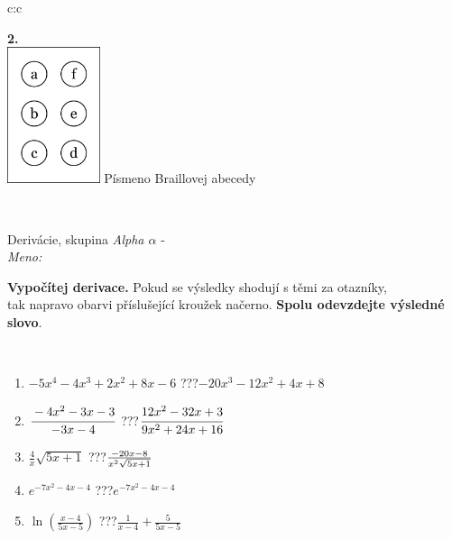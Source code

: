 \documentclass[10pt]{report}
\begin{document}
\begin{tabular}{c:c}
\begin{minipage}[c][104.5mm][t]{0.5\linewidth}
\begin{center}
\begin{minipage}{0.20\linewidth}
\begin{center}
{\Huge\bfseries 2.} \\[2mm]
\includegraphics[height=40mm]{../images/braille.png}
{\small Písmeno Braillovej abecedy}
\end{center}
\end{minipage}
\end{center}
\end{minipage}
\\ \hdashline
\begin{minipage}[c][104.5mm][t]{0.5\linewidth}
\begin{center}
\vspace{7mm}
{\huge Derivácie, skupina \textit{Alpha $\alpha$} -}\\[5mm]
\textit{Meno:}\phantom{xxxxxxxxxxxxxxxxxxxxxxxxxxxxxxxxxxxxxxxxxxxxxxxxxxxxxxxxxxxxxxxxx}\\[5mm]
\begin{minipage}{0.95\linewidth}
\begin{center}
\textbf{Vypočítej derivace.} Pokud se výsledky shodují s těmi za otazníky,\\tak napravo obarvi příslušející kroužek načerno. \textbf{Spolu odevzdejte výsledné slovo}.
\end{center}
\end{minipage}
\\[1mm]
\begin{minipage}{0.79\linewidth}
\begin{center}
\begin{varwidth}{\linewidth}
\begin{enumerate}
\normalsize
\item $-5x^4-4x^3+2x^2+8x-6$\quad \dotfill\; ???\;\dotfill \quad $-20x^3-12x^2+4x+8$
\item $\cfrac{-4x^2-3x-3}{-3x-4}$\quad \dotfill\; ???\;\dotfill \quad $\cfrac{12x^2-32x+3}{9x^2+24x+16}$
\item $\frac{4}{x}\sqrt{5x+1}$\quad \dotfill\; ???\;\dotfill \quad $\frac{-20x-8}{x^2 \sqrt{\smash[b]{5x+1}}}$
\item $e^{-7x^2-4x-4}$\quad \dotfill\; ???\;\dotfill \quad $e^{-7x^2-4x-4}$
\item $\ln{\left(\frac{x-4}{5x-5}\right)}$\quad \dotfill\; ???\;\dotfill \quad $\frac{1}{x-4}+\frac{5}{5x-5}$

\end{enumerate}
\end{varwidth}
\end{center}
\end{minipage}
\end{center}
\end{minipage}
\end{tabular}
\end{document}
